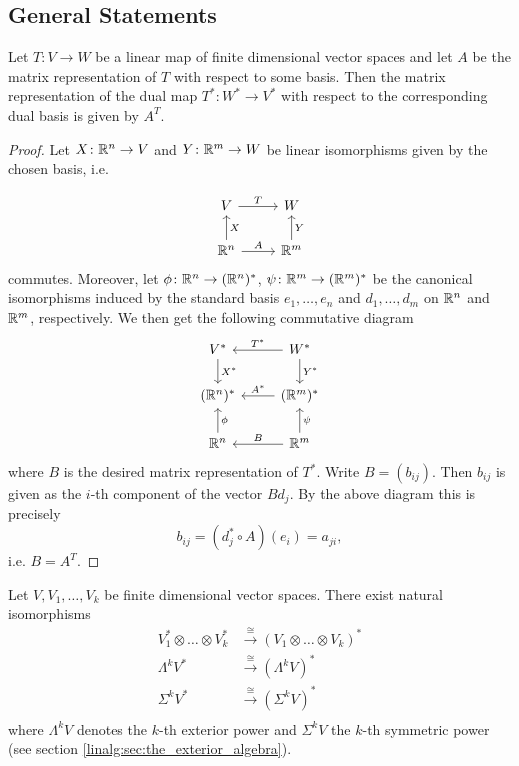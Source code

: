 \subsection{General Statements}

\begin{lemma}
    Let $T \colon V \to W$ be a linear map of finite dimensional vector spaces and let $A$ be the matrix representation of $T$ with respect to some basis. Then the matrix representation of the dual map $T^\ast \colon W^\ast \to V^\ast$ with respect to the corresponding dual basis is given by $A^T$.
\end{lemma}

\begin{proof}
    Let $X \colon \mathbb{R}^n \to V$ and $Y \colon \mathbb{R}^m \to W$ be linear isomorphisms given by the chosen basis, i.e.

    \[\begin{tikzcd}
	V & W \\
	{\mathbb{R}^n} & {\mathbb{R}^m}
	\arrow["T", from=1-1, to=1-2]
	\arrow["X"', from=2-1, to=1-1]
	\arrow["A", from=2-1, to=2-2]
	\arrow["Y"', from=2-2, to=1-2]
    \end{tikzcd}\]
    commutes. Moreover, let $\phi \colon \mathbb{R}^n \to (\mathbb{R}^n)^\ast$, $\psi \colon \mathbb{R}^m \to (\mathbb{R}^m)^\ast$ be the canonical isomorphisms induced by the standard basis $e_1,\ldots,e_n$ and $d_1,\ldots,d_m$ on $\mathbb{R}^n$ and $\mathbb{R}^m$, respectively. We then get the following commutative diagram
    \[\begin{tikzcd}
	{V^\ast} & {W^\ast} \\
	{(\mathbb{R}^n)^\ast} & {(\mathbb{R}^m)^\ast} \\
	{\mathbb{R}^n} & {\mathbb{R}^m}
	\arrow["{X^\ast}", from=1-1, to=2-1]
	\arrow["{T^\ast}"', from=1-2, to=1-1]
	\arrow["{Y^\ast}", from=1-2, to=2-2]
	\arrow["{A^\ast}"', from=2-2, to=2-1]
	\arrow["\phi"', from=3-1, to=2-1]
	\arrow["\psi"', from=3-2, to=2-2]
	\arrow["B"', from=3-2, to=3-1]
    \end{tikzcd}\]
    where $B$ is the desired matrix representation of $T^\ast$. Write $B = (b_{ij})$. Then $b_{ij}$ is given as the $i$-th component of the vector $Bd_j$. By the above diagram this is precisely
    \[
    b_{ij} = (d_j^\ast \circ A)(e_i) = a_{ji},
    \]
    i.e. $B = A^T$.
\end{proof}

\begin{lemma}
	Let $V, V_1,\ldots,V_k$ be finite dimensional vector spaces. There exist natural isomorphisms
	\begin{align*}
		V_1^\ast \otimes \ldots \otimes V_k^\ast & \xrightarrow{\cong} (V_1 \otimes \ldots \otimes V_k)^\ast \\
		\Lambda^k V^\ast &\xrightarrow{\cong} (\Lambda^k V)^\ast \\
		\Sigma^k V^\ast &\xrightarrow{\cong} (\Sigma^k V)^\ast \\
	\end{align*}
	where $\Lambda^k V$ denotes the $k$-th exterior power and $\Sigma^k V$ the $k$-th symmetric power (see section \ref{linalg:sec:the_exterior_algebra}).
\end{lemma}

